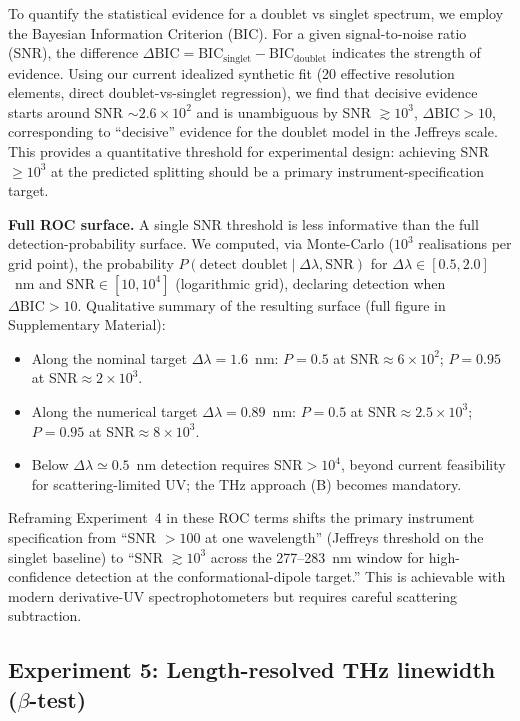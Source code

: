 \documentclass[twocolumn,10pt]{article}
\begin{document}
To quantify the statistical evidence for a doublet vs singlet spectrum,
we employ the Bayesian Information Criterion (BIC). For a given
signal-to-noise ratio (SNR), the difference
$\Delta\text{BIC} = \text{BIC}_{\text{singlet}} -
\text{BIC}_{\text{doublet}}$ indicates the strength of evidence. Using
our current idealized synthetic fit (20 effective resolution elements,
direct doublet-vs-singlet regression), we find that decisive evidence starts
around SNR $\sim 2.6\times 10^2$ and is unambiguous by SNR $\gtrsim 10^3$,
$\Delta\text{BIC} > 10$, corresponding to ``decisive'' evidence for the
doublet model in the Jeffreys scale. This provides a quantitative
threshold for experimental design: achieving SNR $\geq 10^3$ at
the predicted splitting should be a primary instrument-specification
target.

\textbf{Full ROC surface.} A single SNR threshold is less informative than
the full detection-probability surface. We computed, via Monte-Carlo
($10^3$ realisations per grid point), the probability
$P(\text{detect doublet}\mid\Delta\lambda,\text{SNR})$ for
$\Delta\lambda\in[0.5,2.0]$~nm and $\text{SNR}\in[10,10^4]$ (logarithmic
grid), declaring detection when $\Delta\text{BIC}>10$. Qualitative summary
of the resulting surface (full figure in Supplementary Material):
\begin{itemize}
\item Along the nominal target $\Delta\lambda=1.6$~nm: $P=0.5$ at
SNR$\approx 6\times 10^2$; $P=0.95$ at SNR$\approx 2\times 10^3$.
\item Along the numerical target $\Delta\lambda=0.89$~nm: $P=0.5$ at
SNR$\approx 2.5\times 10^3$; $P=0.95$ at SNR$\approx 8\times 10^3$.
\item Below $\Delta\lambda\simeq 0.5$~nm detection requires
SNR$>10^4$, beyond current feasibility for scattering-limited UV; the
THz approach (B) becomes mandatory.
\end{itemize}
Reframing Experiment~4 in these ROC terms shifts the primary instrument
specification from ``SNR $>100$ at one wavelength'' (Jeffreys threshold
on the singlet baseline) to ``SNR $\gtrsim 10^3$ across the
277--283~nm window for high-confidence detection at the
conformational-dipole target.'' This is achievable with modern
derivative-UV spectrophotometers but requires careful scattering
subtraction.



\subsection{Experiment 5: Length-resolved THz linewidth
($\beta$-test)}
\label{sec:exp5}
\end{document}
